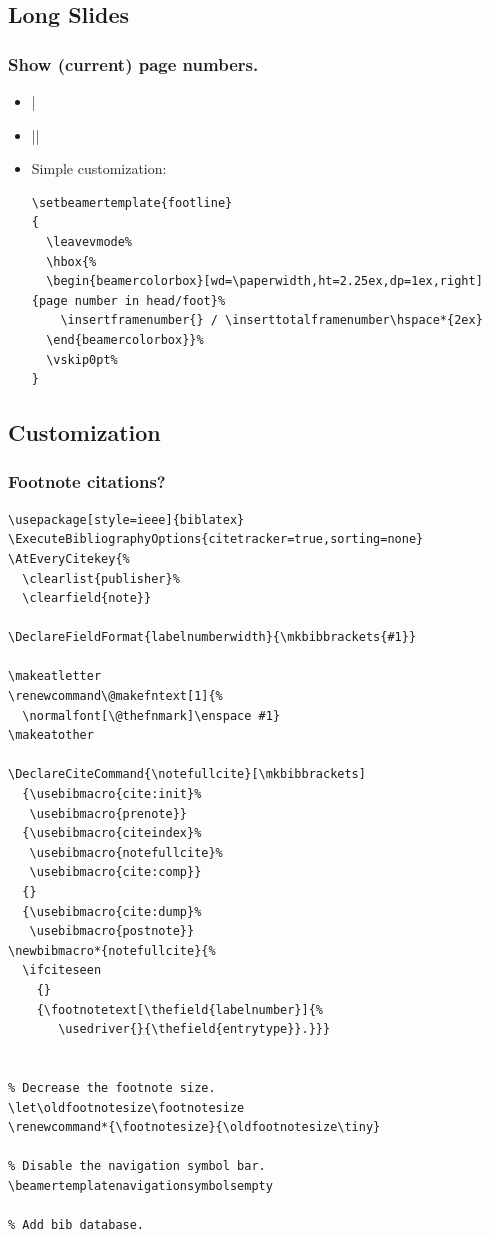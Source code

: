 \documentclass[CJKchecksingle]{beamer}
\begin{document}
\subsection{Long Slides}
\begin{frame}[fragile]\frametitle{Show (current) page numbers.}
  \begin{itemize}
    \item | %
    \item ||
    \item Simple customization:
\begin{lstlisting}
\setbeamertemplate{footline}
{
  \leavevmode%
  \hbox{%
  \begin{beamercolorbox}[wd=\paperwidth,ht=2.25ex,dp=1ex,right]{page number in head/foot}%
    \insertframenumber{} / \inserttotalframenumber\hspace*{2ex}
  \end{beamercolorbox}}%
  \vskip0pt%
}
\end{lstlisting}
  \end{itemize}
\end{frame}

\subsection{Customization}

\begin{frame}\frametitle{Footnote citations?}

\begin{lstlisting}
\usepackage[style=ieee]{biblatex}
\ExecuteBibliographyOptions{citetracker=true,sorting=none}
\AtEveryCitekey{%
  \clearlist{publisher}%
  \clearfield{note}}

\DeclareFieldFormat{labelnumberwidth}{\mkbibbrackets{#1}}

\makeatletter
\renewcommand\@makefntext[1]{%
  \normalfont[\@thefnmark]\enspace #1}
\makeatother

\DeclareCiteCommand{\notefullcite}[\mkbibbrackets]
  {\usebibmacro{cite:init}%
   \usebibmacro{prenote}}
  {\usebibmacro{citeindex}%
   \usebibmacro{notefullcite}%
   \usebibmacro{cite:comp}}
  {}
  {\usebibmacro{cite:dump}%
   \usebibmacro{postnote}}
\newbibmacro*{notefullcite}{%
  \ifciteseen
    {}
    {\footnotetext[\thefield{labelnumber}]{%
       \usedriver{}{\thefield{entrytype}}.}}}


% Decrease the footnote size.
\let\oldfootnotesize\footnotesize
\renewcommand*{\footnotesize}{\oldfootnotesize\tiny}

% Disable the navigation symbol bar.
\beamertemplatenavigationsymbolsempty

% Add bib database.

\end{lstlisting}
\end{frame}
\end{document}

